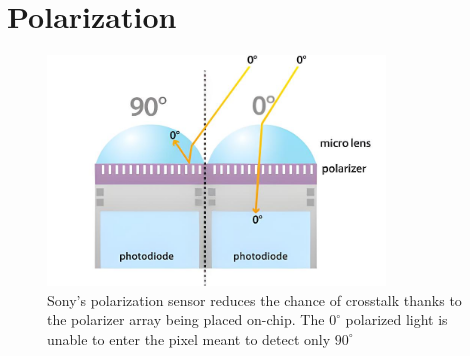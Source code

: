 \section{Polarization}

\begin{figure}
    \centering
    \includegraphics[width=0.8\textwidth]{figures/crosstalk_off_upscaled.jpg}
    \caption{Sony's polarization sensor reduces the chance of crosstalk thanks to the polarizer array being placed on-chip. The $0^{\circ}$ polarized light is unable to enter the pixel meant to detect only $90^{\circ}$ \cite{lucidvisionlabsPolarizationExplainedSony2018}}
    \label{fig:camera_no_crosstalk}
\end{figure}